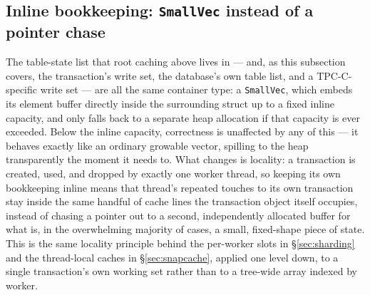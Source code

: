 \documentclass[11pt]{article}
\newcommand{\code}[1]{\texttt{#1}}
\begin{document}
\subsection{Inline bookkeeping: \code{SmallVec} instead of a pointer chase}
\label{sec:smallvec}

The table-state list that root caching above lives in --- and, as this subsection
covers, the transaction's write set, the database's own table list, and a
TPC-C-specific write set --- are all the same container type: a \code{SmallVec},
which embeds its element buffer directly inside the surrounding struct up to a fixed
inline capacity, and only falls back to a separate heap allocation if that capacity
is ever exceeded. Below the inline capacity, correctness is unaffected by any of
this --- it behaves exactly like an ordinary growable vector, spilling to the heap
transparently the moment it needs to. What changes is locality: a transaction is
created, used, and dropped by exactly one worker thread, so keeping its own
bookkeeping inline means that thread's repeated touches to its own transaction stay
inside the same handful of cache lines the transaction object itself occupies,
instead of chasing a pointer out to a second, independently allocated buffer for
what is, in the overwhelming majority of cases, a small, fixed-shape piece of state.
This is the same locality principle behind the per-worker slots in
\S\ref{sec:sharding} and the thread-local caches in \S\ref{sec:snapcache}, applied
one level down, to a single transaction's own working set rather than to a
tree-wide array indexed by worker.
\end{document}
